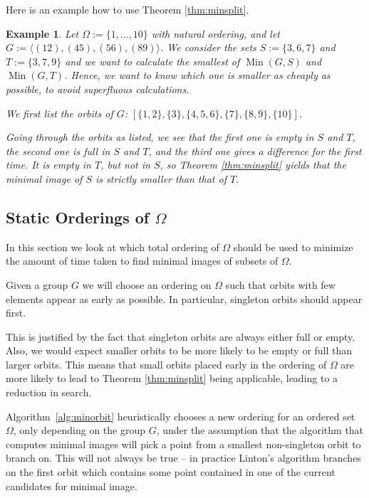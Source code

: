 \documentclass[preprint,12pt]{elsarticle}
\newtheorem{ex}[theorem]{Example}
\newcommand{\Min}{\operatorname{Min}}
\begin{document}
Here is an example how to use Theorem \ref{thm:minsplit}.

\begin{ex}
Let $\Omega:=\{1,\dots,10\}$ with natural ordering, and let
$G:=\langle (12), (45),(56), (89)\rangle$. We consider the sets $S:=\{3,6,7\}$
and $T:=\{3,7,9\}$ and we want to calculate the smallest of \(\Min(G,S)\) and
\(\Min(G,T)\). Hence, we want to know which one is smaller as cheaply as
possible, to avoid
superfluous calculations.

We first list the orbits of $G$:
$[\{1,2\},\{3\},\{4,5,6\},\{7\},\{8,9\},\{10\}]$.

Going through the orbits as listed, we see that the first one is empty in $S$
and $T$, the second one is full in $S$ and $T$, and the third one gives a
difference for the first time. It is empty in $T$, but not in $S$, so Theorem
\ref{thm:minsplit} yields that the minimal image of $S$ is strictly smaller than
that of $T$.

\end{ex}

\subsection{Static Orderings of \(\Omega\)}\label{sec:static}

In this section we look at
which total ordering of \(\Omega\) should be used to minimize the amount
of time taken to find minimal images of subsets of $\Omega$.

Given a group \(G\) we will choose an ordering on $\Omega$ such that orbits
with few elements appear as early as possible. In particular, singleton orbits should
appear first.

This is justified by the fact that singleton orbits are always either full or empty. Also,
we would expect smaller orbits to be more likely
to be empty or full than larger orbits. This means that small orbits placed early
in the ordering of \(\Omega\) are
more likely to lead to Theorem \ref{thm:minsplit} being applicable, leading to a
reduction in search.

Algorithm~\ref{alg:minorbit} heuristically chooses a new ordering for an ordered
set \(\Omega\), only depending on the group $G$, under the assumption that the
algorithm that computes minimal images will pick a point from a smallest
non-singleton orbit to branch on.
This will not always be true -- in practice Linton's algorithm branches on the
first orbit which contains some point contained in one of the current candidates
for minimal image.
\end{document}
